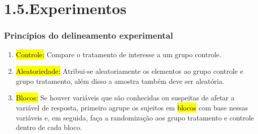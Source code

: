 
\section{1.5.Experimentos}

\begin{frame}
\frametitle{Princípios do delineamento experimental}

\begin{enumerate}
\justifying
\item \hl{Controle:} Compare o tratamento de interesse a um grupo controle.
\justifying
\item \hl{Aleatoriedade:} Atribui-se aleatoriamente os elementos ao grupo controle e grupo tratamento, além disso a amostra também deve ser aleatória.
\justifying
\item \hl{Blocos:} Se houver variáveis que são conhecidas ou suspeitas de afetar a variável de resposta, primeiro agrupe os sujeitos em \hl {blocos} com base nessas variáveis e, em seguida, faça a randomização aos grupo tratamento e controle dentro de cada bloco.

\end{enumerate}

\end{frame}


